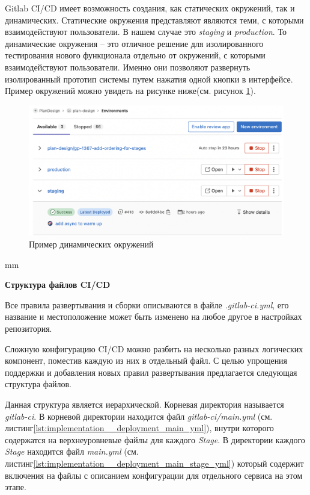 Gitlab CI/CD имеет возможность создания, как статических окружений, так и динамических.
Статические окружения представляют являются теми, с которыми взаимодействуют пользователи.
В нашем случае это \textit{staging} и \textit{production}.
То динамические окружения -- это отличное решение для изолированного тестирования нового функционала
отдельно от окружений, с которыми взаимодействуют пользователи. Именно они позволяют развернуть
изолированный прототип системы путем нажатия одной кнопки в интерфейсе.
Пример окружений можно увидеть на рисунке ниже(см. рисунок \ref{pic:implementation__deployment-environment}).
\begin{figure}[H]
	\includegraphics[width=\textwidth]{implementation/pictures/deployment/environment}
	\caption{Пример динамических окружений}
	\label{pic:implementation__deployment-environment}
\end{figure}
 mm

\noindent \textbf{Структура файлов CI/CD}

Все правила развертывания и сборки описываются в файле \textit{.gitlab-ci.yml},
его название и местоположение может быть изменено на любое другое в настройках репозитория.

Сложную конфигурацию CI/CD можно разбить на несколько разных логических компонент, поместив каждую из них
в отдельный файл.
С целью упрощения поддержки и добавления новых правил развертывания предлагается следующая структура файлов.

\vskip 5mm

Данная структура является иерархической.
Корневая директория называется \textit{gitlab-ci}. В корневой директории находится файл
\textit{gitlab-ci/main.yml}
(см. листинг\ref{lst:implementation__deployment_main_yml}),
внутри которого содержатся на верхнеуровневые файлы для каждого \textit{Stage}.
В директории каждого \textit{Stage} находится файл \textit{main.yml} (см. листинг\ref{lst:implementation__deployment_main_stage_yml})
который содержит включения на файлы
с описанием конфигурации для отдельного сервиса на этом этапе.

